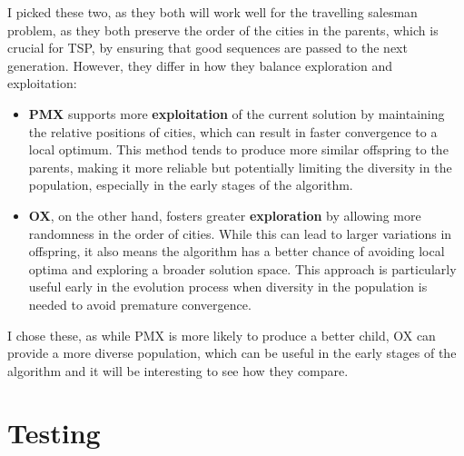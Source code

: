 \documentclass[11pt]{scrartcl} %
\begin{document}
I picked these two, as they both will work well for the travelling salesman problem, as they both preserve the order of the cities in the parents, which is crucial for TSP, by ensuring that good sequences are passed to the next generation. However, they differ in how they balance exploration and exploitation:

\begin{itemize}
    \item \textbf{PMX} supports more \textbf{exploitation} of the current solution by maintaining the relative positions of cities, which can result in faster convergence to a local optimum. This method tends to produce more similar offspring to the parents, making it more reliable but potentially limiting the diversity in the population, especially in the early stages of the algorithm.
    
    \item \textbf{OX}, on the other hand, fosters greater \textbf{exploration} by allowing more randomness in the order of cities. While this can lead to larger variations in offspring, it also means the algorithm has a better chance of avoiding local optima and exploring a broader solution space. This approach is particularly useful early in the evolution process when diversity in the population is needed to avoid premature convergence.
\end{itemize}

I chose these, as while PMX is more likely to produce a better child, OX can provide a more diverse population, which can be useful in the early stages of the algorithm and it will be interesting to see how they compare.


\section{Testing}
\end{document}
